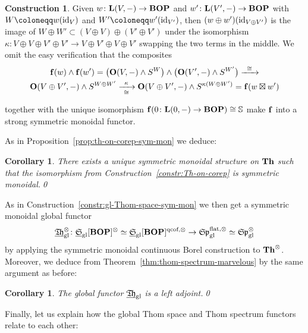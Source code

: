 \documentclass[reqno]{memo-l}
\theoremstyle{mythm}
\newtheorem{cor}[thm]{Corollary}
\theoremstyle{definition}
\newtheorem{constr}[thm]{Construction}
\numberwithin{equation}{section}
\newcommand{\gl}{\textup{gl}}
\newcommand{\cat}[1]{\textbf{\textup{#1}}}
\newcommand{\id}{\textup{id}}
\newcommand{\ulhelper}[2]{\underline{\setbox0=\hbox{$#1#2$}\dp0=0.4pt \box0\relax}}
\newcommand{\ul}[1]{{\mathpalette\ulhelper{#1}}\hbox{\rule[-2pt]{0pt}{0pt}}}
\let\smashp=\wedge
\newcommand{\mySp}{{\mathfrak S\kern-.5pt\mathfrak p}}
\newcommand{\myS}{{{\mathfrak S\kern-.4pt}}}
\newcommand{\myTh}{{\mathfrak T\kern-1pt\mathfrak h}}
\begin{document}
\begin{constr}
    Given $w\colon\cat{L}(V,-)\to\cat{BOP}$ and $w'\colon\cat{L}(V',-)\to\cat{BOP}$ with $W\coloneqq w(\id_V)$ and $W'\coloneqq w'(\id_{V'})$, then $(w\oplus w')(\id_{V\oplus V'})$ is the image of $W\oplus W'\subset (V\oplus V)\oplus (V'\oplus V')$ under the isomorphism $\kappa\colon V\oplus V\oplus V'\oplus V'\to V\oplus V'\oplus V\oplus V'$ swapping the two terms in the middle. We omit the easy verification that the composites
    \begin{multline*}
        \cat{f}(w)\smashp \cat{f}(w')=\big(\cat{O}(V,-)\smashp S^W\big)\smashp\big(\cat{O}(V',-)\smashp S^{W'}\big)\xrightarrow{\;\;\cong\;\;}\\\cat{O}(V\oplus V',-)\smashp S^{W\oplus W'}
        \xrightarrow[\raise3.5pt\hbox{$\scriptstyle\cong$}]{\;\;\kappa\;\;}\cat{O}(V\oplus V',-)\smashp S^{\kappa(W\oplus W')}=\cat{f}(w\boxtimes w')
    \end{multline*}
    together with the unique isomorphism $\cat{f}(0\colon\cat{L}(0,-)\to\cat{BOP})\cong\mathbb S$ make $\cat{f}$ into a strong symmetric monoidal functor.
\end{constr}

As in Proposition~\ref{prop:th-on-corep-sym-mon} we deduce:

\begin{cor}
    There exists a unique symmetric monoidal structure on $\cat{Th}$ such that the isomorphism from Construction~\ref{constr:Th-on-corep} is symmetric monoidal.\qed
\end{cor}

As in Construction~\ref{constr:gl-Thom-space-sym-mon} we then get a symmetric monoidal global functor
\[
    \ul\myTh_\gl^\otimes\colon\ul\myS_\gl[\cat{BOP}]^\otimes\simeq\ul\myS_\gl[\cat{BOP}]^{\text{qcof},\otimes}\to\mySp_\gl^{\text{flat},\otimes}\simeq\mySp_\gl^\otimes
\]
by applying the symmetric monoidal continuous Borel construction to $\cat{Th}^\otimes$. Moreover, we deduce from Theorem~\ref{thm:thom-spectrum-marvelous} by the same argument as before:

\begin{cor}\label{cor:gl-Thom-spectrum-la}
    The global functor $\ul\myTh_\gl$ is a left adjoint.\qed
\end{cor}

Finally, let us explain how the global Thom space and Thom spectrum functors relate to each other:
\end{document}
